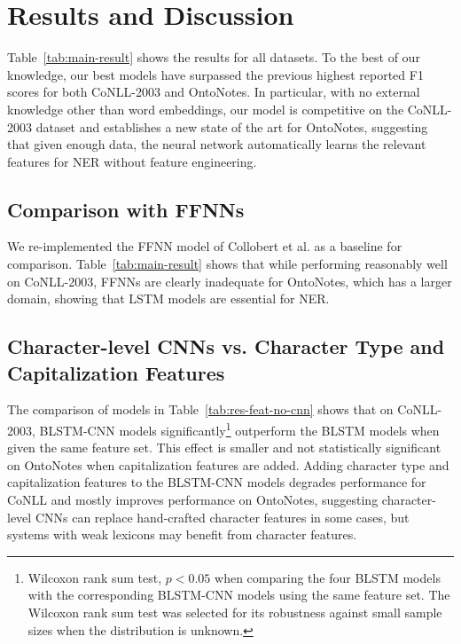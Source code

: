 \documentclass[11pt,letterpaper]{article}
\begin{document}
\section{Results and Discussion}

Table~\ref{tab:main-result} shows the results for all datasets. To the best of our knowledge, our best models have surpassed the previous highest reported F1 scores for both CoNLL-2003 and OntoNotes. In particular, with no external knowledge other than word embeddings, our model is competitive on the CoNLL-2003 dataset and establishes a new state of the art for OntoNotes, suggesting that given enough data, the neural network automatically learns the relevant features for NER without feature engineering.

\subsection{Comparison with FFNNs}

We re-implemented the FFNN model of Collobert et al.  as a baseline for comparison. Table~\ref{tab:main-result} shows that while performing reasonably well on CoNLL-2003, FFNNs are clearly inadequate for OntoNotes, which has a larger domain, showing that LSTM models are essential for NER.

\subsection{Character-level CNNs vs. Character Type and Capitalization Features}

The comparison of models in Table~\ref{tab:res-feat-no-cnn} shows that on CoNLL-2003, BLSTM-CNN models significantly\footnote{Wilcoxon rank sum test, $p < 0.05$ when comparing the four BLSTM models with the corresponding BLSTM-CNN models using the same feature set. The Wilcoxon rank sum test was selected for its robustness against small sample sizes when the distribution is unknown.} outperform the BLSTM models when given the same feature set. This effect is smaller and not statistically significant on OntoNotes when capitalization features are added. 
Adding character type and capitalization features to the BLSTM-CNN models degrades performance for CoNLL and mostly improves performance on OntoNotes, suggesting character-level CNNs can replace hand-crafted character features in some cases, but systems with weak lexicons may benefit from character features.
\end{document}
